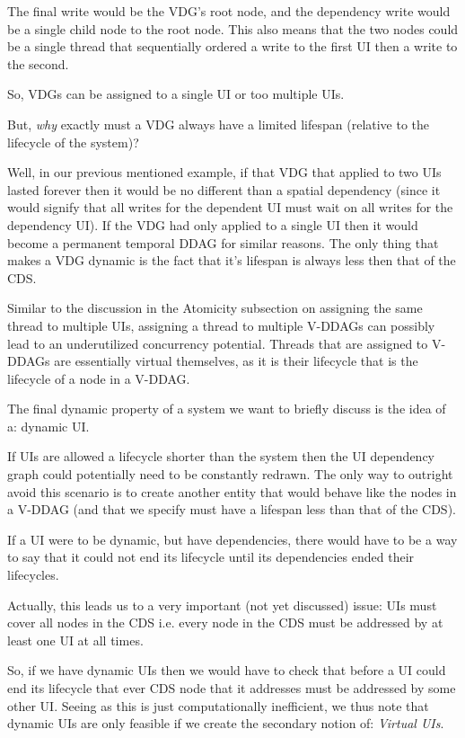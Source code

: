 The final write would be the VDG's root node, and the dependency write would be a single child node to the root node. This also means that the two nodes could be a single thread that sequentially ordered a write to the first UI then a write to the second.

So, VDGs can be assigned to a single UI or too multiple UIs.

But, \textit{why} exactly must a VDG always have a limited lifespan (relative to the lifecycle of the system)? 

Well, in our previous mentioned example, if that VDG that applied to two UIs lasted forever then it would be no different than a spatial dependency (since it would signify that all writes for the dependent UI must wait on all writes for the dependency UI). If the VDG had only applied to a single UI then it would become a permanent temporal DDAG for similar reasons. The only thing that makes a VDG dynamic is the fact that it's lifespan is always less then that of the CDS.

Similar to the discussion in the Atomicity subsection on assigning the same thread to multiple UIs, assigning a thread to multiple V-DDAGs can possibly lead to an underutilized concurrency potential. Threads that are assigned to V-DDAGs are essentially virtual themselves, as it is their lifecycle that is the lifecycle of a node in a V-DDAG.

The final dynamic property of a system we want to briefly discuss is the idea of a: dynamic UI.

If UIs are allowed a lifecycle shorter than the system then the UI dependency graph could potentially need to be constantly redrawn. The only way to outright avoid this scenario is to create another entity that would behave like the nodes in a V-DDAG (and that we specify must have a lifespan less than that of the CDS).

If a UI were to be dynamic, but have dependencies, there would have to be a way to say that it could not end its lifecycle until its dependencies ended their lifecycles.

Actually, this leads us to a very important (not yet discussed) issue: UIs must cover all nodes in the CDS i.e. every node in the CDS must be addressed by at least one UI at all times. 

So, if we have dynamic UIs then we would have to check that before a UI could end its lifecycle that ever CDS node that it addresses must be addressed by some other UI. Seeing as this is just computationally inefficient, we thus note that dynamic UIs are only feasible if we create the secondary notion of: \textit{Virtual UIs}.


